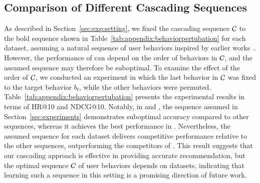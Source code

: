 \subsection{Comparison of Different Cascading Sequences}
\label{sec:appendix:Performance_for_Different_Cascading_Sequences}

As described in Section~\ref{sec:exp:setting}, we fixed the cascading sequence $\mathcal{C}$ to the bold sequence shown in Table~\ref{tab:appendix:behaviorpertubation} for each dataset, assuming a natural sequence of user behaviors inspired by earlier works~\cite{LiuXWY00024, yin2024hecgcn, ChengCHLZGP23fqvn, YanCGSLSL24}.
However, the performance of \method can depend on the order of behaviors in $\mathcal{C}$, and the assumed sequence may therefore be suboptimal.
To examine the effect of the order of $\mathcal{C}$, we conducted an experiment in which the last behavior in $\mathcal{C}$ was fixed to the target behavior $b_t$, while the other behaviors were permuted.
Table~\ref{tab:appendix:behaviorpertubation} presents the experimental results in terms of HR@10 and NDCG@10.
Notably, in \taobao and \tmall, the sequence assumed in Section~\ref{sec:experiments} demonstrates suboptimal accuracy compared to other sequences, whereas it achieves the best performance in \tenrec.
Nevertheless, the assumed sequence for each dataset delivers competitive performance relative to the other sequences, outperforming the competitors of \method.
This result suggests that our cascading approach is effective in providing accurate recommendation, but the optimal sequence $\mathcal{C}$ of user behaviors depends on datasets, indicating that learning such a sequence in this setting is a promising direction of future work.

